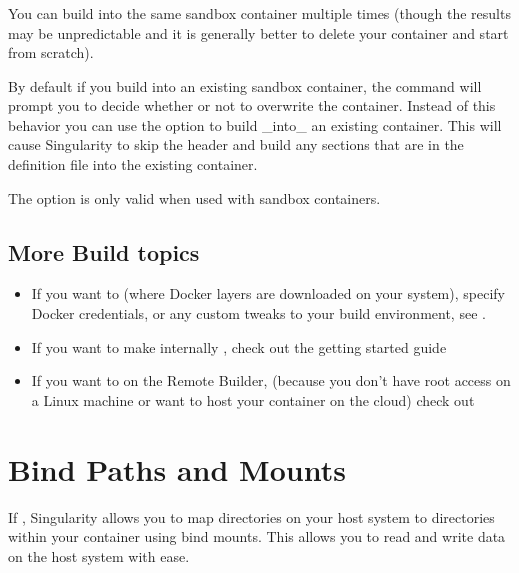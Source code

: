 \documentclass[letterpaper,10pt,english]{sphinxmanual}
\begin{document}
\subsection{}
\label{\detokenize{build_a_container:update}}
You can build into the same sandbox container multiple times (though the results
may be unpredictable and it is generally better to delete your container and
start from scratch).

By default if you build into an existing sandbox container, the  
command will prompt you to decide whether or not to overwrite the container.
Instead of this behavior you can use the  option to build \_into\_ an
existing container. This will cause Singularity to skip the header and build
any sections that are in the definition file into the existing container.

The  option is only valid when used with sandbox containers.


\section{More Build topics}
\label{\detokenize{build_a_container:more-build-topics}}\begin{itemize}
\item {} 
If you want to  (where Docker layers are
downloaded on your system), specify Docker credentials, or any custom tweaks
to your build environment, see .

\item {} 
If you want to make internally , check out the getting
started guide 

\item {} 
If you want to  on the Remote Builder, (because you
don’t have root access on a Linux machine or want to host your container on
the cloud) check out 

\end{itemize}


\chapter{Bind Paths and Mounts}
\label{\detokenize{bind_paths_and_mounts:bind-paths-and-mounts}}\label{\detokenize{bind_paths_and_mounts:id1}}\label{\detokenize{bind_paths_and_mounts::doc}}\label{\detokenize{bind_paths_and_mounts:sec-bindpaths}}
If ,
Singularity allows you to map directories on your host system to directories
within your container using bind mounts. This allows you to read and write data
on the host system with ease.
\end{document}
